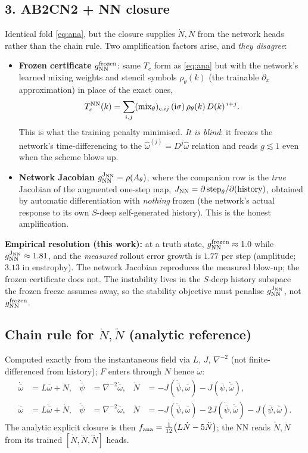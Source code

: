 \documentclass[11pt]{article}
\newcommand{\ii}{\mathrm{i}}
\newcommand{\wh}{\hat{\omega}}
\begin{document}
\subsection*{3. AB2CN2 + NN closure}
Identical fold \eqref{eq:ana}, but the closure supplies $\dot N,\ddot N$ from the
network heads rather than the chain rule. Two amplification factors arise, and
\emph{they disagree}:
\begin{itemize}
\item \textbf{Frozen certificate} $g^{\rm frozen}_{\rm NN}$: same $T_c$ form as
\eqref{eq:ana} but with the network's learned mixing weights and stencil symbols
$\rho_\theta(k)$ (the trainable $\partial_x$ approximation) in place of the exact ones,
\[
  T^{\rm NN}_{c}(k)=\sum_{i,j}(\text{mix}_\theta)_{c,ij}\,(\ii\sigma)\,\rho_\theta(k)\,D(k)^{\,i+j}.
\]
This is what the training penalty minimised. \emph{It is blind}: it freezes the
network's time-differencing to the $\wh^{(j)}=D^{j}\wh$ relation and reads
$g\lesssim1$ even when the scheme blows up.
\item \textbf{Network Jacobian} $g^{\rm J_{NN}}_{\rm NN}=\rho(A_\theta)$, where the
companion row is the \emph{true} Jacobian of the augmented one-step map,
$J_{\rm NN}=\partial\,\mathrm{step}_\theta/\partial(\text{history})$, obtained by
automatic differentiation with \emph{nothing} frozen (the network's actual response
to its own $S$-deep self-generated history). This is the honest amplification.
\end{itemize}
\textbf{Empirical resolution (this work):} at a truth state, $g^{\rm frozen}_{\rm NN}\approx1.0$
while $g^{\rm J_{NN}}_{\rm NN}\approx1.81$, and the \emph{measured} rollout error growth
is $1.77$ per step (amplitude; $3.13$ in enstrophy). The network Jacobian reproduces the
measured blow-up; the frozen certificate does not. The instability lives in the
$S$-deep history subspace the frozen freeze assumes away, so the stability objective
must penalise $g^{\rm J_{NN}}_{\rm NN}$, not $g^{\rm frozen}_{\rm NN}$.

\subsection*{Chain rule for $\dot N,\ddot N$ (analytic reference)}
\label{sec:chain}
Computed exactly from the instantaneous field via $L$, $J$, $\nabla^{-2}$
(not finite-differenced from history); $F$ enters through $N$ hence $\dot\omega$:
\begin{align}
  \dot{\bar\omega} &= L\bar\omega+N, & \dot{\bar\psi} &= \nabla^{-2}\dot{\bar\omega}, &
  \dot N &= -J(\dot{\bar\psi},\bar\omega)-J(\bar\psi,\dot{\bar\omega}),\\
  \ddot{\bar\omega} &= L\dot{\bar\omega}+\dot N, & \ddot{\bar\psi} &= \nabla^{-2}\ddot{\bar\omega}, &
  \ddot N &= -J(\ddot{\bar\psi},\bar\omega)-2J(\dot{\bar\psi},\dot{\bar\omega})-J(\bar\psi,\ddot{\bar\omega}).
\end{align}
The analytic explicit closure is then $f_{\rm ana}=\tfrac{1}{12}\big(L\dot N-5\ddot N\big)$;
the NN reads $\dot N,\ddot N$ from its trained $[\dot N,\ddot N,\dddot N]$ heads.
\end{document}
